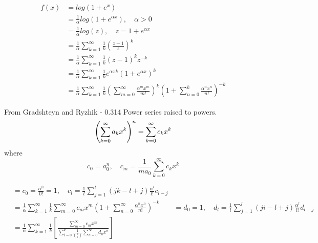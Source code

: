 


\begin{align*}
	f(x) & = log(1+e^x)\\
	& = \frac{1}{\alpha}log(1+e^{\alpha x}), \quad \alpha > 0 \\
	& = \frac{1}{\alpha}log(z), \quad z = 1 + e^{\alpha x} \\
	& = \frac{1}{\alpha}\sum\limits_{k=1}^\infty
	\frac{1}{k}\left(\frac{z-1}{z}\right)^k \\
	& = \frac{1}{\alpha}\sum\limits_{k=1}^\infty
	\frac{1}{k}(z-1)^{k} z^{-k} \\
	& = \frac{1}{\alpha}\sum\limits_{k=1}^\infty
	\frac{1}{k} e^{\alpha x k} (1 + e^{\alpha x})^{k} \\
	& = \frac{1}{\alpha}\sum\limits_{k=1}^\infty
	\frac{1}{k} \left(\sum\limits_{m=0}^\infty
	\frac{\alpha^{m} x^{m}}{m!}\right)^k \left(1 + \sum\limits_{n=0}^{k} \frac{\alpha^{n} x^{n}}{n!}\right)^{-k}
\end{align*}

From Gradshteyn and Ryzhik - 0.314 Power series raised to powers.
\begin{equation}
	\left(\sum\limits_{k=0}^{\infty}a_{k}x^{k}\right)^{n} = \sum\limits_{k=0}^{\infty}c_{k}x^{k} \\
	\label{eqn:power series raised to powers}
\end{equation}
where
\begin{equation}
	c_{0} = a_{0}^{n}, \quad c_{m} = \frac{1}{ma_{0}}\sum\limits_{k=0}^{\infty}c_{k}x^{k}
\end{equation}

\begin{align*}
	& = c_{0} = \frac{\alpha^{0}}{0!}=1, \quad c_{l} = \frac{1}{l}\sum\limits_{j=1}^{l}(jk-l+j)\frac{\alpha^{l}}{l!}c_{l-j} \\
	& = \frac{1}{\alpha}\sum\limits_{k=1}^{\infty}\frac{1}{k}\sum\limits_{m=0}^{\infty}c_{m}x^{m}\left( 1+\sum\limits_{n=0}^{\infty}\frac{\alpha^{n}x^{n}}{n!}\right)^{-k}
	& = d_{0} = 1, \quad d_{l}=\frac{1}{l}\sum\limits_{j=1}^{l}(ji-l+j)\frac{\alpha^{l}}{l!}d_{l-j} \\
	& = \frac{1}{\alpha}\sum\limits_{k=1}^{\infty}\frac{1}{k}\left[ \frac{\sum\limits_{m=0}^{\infty}c_{m}x^{m}}{\sum\limits_{i=0}^{k}\frac{1}{{k \choose i}}\sum\limits_{n=0}^{\infty}d_{n}x^{n}} \right] \\
\end{align*}

